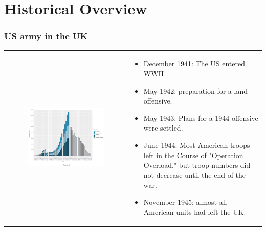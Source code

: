 \documentclass[dvipdfmx,11pt]{beamer}
\begin{document}
\section{Historical Overview}
\frame{\sectionpage}
\begin{frame}\frametitle{US army in the UK}
  \begin{tabular}{ll}
    \begin{minipage}{.45\textwidth}
      \begin{figure}[ht]
        \centering
        \includegraphics[scale = .45]{os1027tanji/f1}
      \end{figure}
    \end{minipage} &
    \begin{minipage}{.5\textwidth}
      \begin{itemize}
        \scriptsize
        \item December 1941: The US entered WWII
        \item May 1942: preparation for a land offensive.
        \item May 1943: Plans for a 1944 offensive were settled.
        \item June 1944: Most American troops left in the Course of "Operation Overload," but troop numbers did not decrease until the end of the war.
        \item November 1945: almost all American units had left the UK.
      \end{itemize}
    \end{minipage}
  \end{tabular}
\end{frame}
\end{document}

